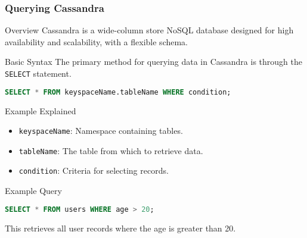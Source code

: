 \documentclass[aspectratio=169]{beamer}
\begin{document}
\begin{frame}[fragile]
    \frametitle{Querying Cassandra}
    \begin{block}{Overview}
        Cassandra is a wide-column store NoSQL database designed for high availability and scalability, with a flexible schema.
    \end{block}
    
    \begin{block}{Basic Syntax}
        The primary method for querying data in Cassandra is through the \texttt{SELECT} statement.
    \end{block}
    
    \begin{lstlisting}[language=SQL]
SELECT * FROM keyspaceName.tableName WHERE condition;
    \end{lstlisting}

    \begin{block}{Example Explained}
        \begin{itemize}
            \item \texttt{keyspaceName}: Namespace containing tables.
            \item \texttt{tableName}: The table from which to retrieve data.
            \item \texttt{condition}: Criteria for selecting records.
        \end{itemize}
    \end{block}
    
    \begin{block}{Example Query}
        \begin{lstlisting}[language=SQL]
SELECT * FROM users WHERE age > 20;
        \end{lstlisting}
        This retrieves all user records where the age is greater than 20.
    \end{block}
\end{frame}
\end{document}

